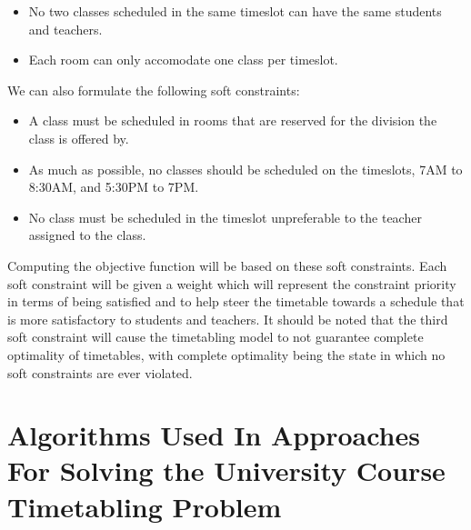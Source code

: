 \begin{itemize}
	\item No two classes scheduled in the same timeslot can have the same students and teachers.
	\item Each room can only accomodate one class per timeslot.
\end{itemize}

We can also formulate the following soft constraints:

\begin{itemize}
	\item A class must be scheduled in rooms that are reserved for the division the class is offered by.
	\item As much as possible, no classes should be scheduled on the timeslots, 7AM to 8:30AM, and 5:30PM to 7PM.
	\item No class must be scheduled in the timeslot unpreferable to the teacher assigned to the class.
\end{itemize}

Computing the objective function will be based on these soft constraints. Each soft constraint will be given a weight which will represent the constraint priority in terms of being satisfied and to help steer the timetable towards a schedule that is more satisfactory to students and teachers. It should be noted that the third soft constraint will cause the timetabling model to not guarantee complete optimality of timetables, with complete optimality being the state in which no soft constraints are ever violated.

\section{Algorithms Used In Approaches For Solving the University Course Timetabling Problem}
